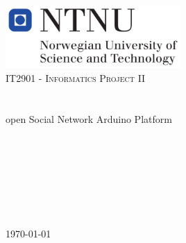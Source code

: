 \begin{titlepage}
	\begin{center}
		\includegraphics[width=0.5\textwidth]{img/NTNU-logo.png}\\[1cm]    
		\textsc{\Large IT2901 - Informatics Project II}\\[0.5cm]
		\HRule \\[0.6cm]
		{ \huge \bfseries \project}\\[0.4cm]
		open Social Network Arduino Platform
		\HRule \\[1.5cm]
		\begin{center} \large
			\emanuele \\
			\anders \\
			\henrik \\
			\johan \\
			\asbjorn \\
			\jonas \\
			\bjornar
		\end{center}
		\vfill
		{\large \today}
	\end{center}
\end{titlepage}
